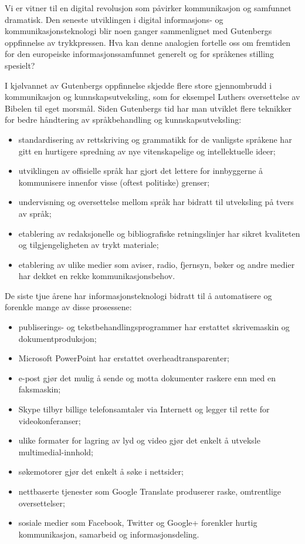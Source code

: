 \begin{multicols}{2}

Vi er vitner til en digital revolusjon som påvirker kommunikasjon og samfunnet dramatisk. Den seneste utviklingen i digital informasjons- og kommunikasjonsteknologi blir noen ganger sammenlignet med Gutenbergs oppfinnelse av trykkpressen. Hva kan denne analogien fortelle oss om fremtiden for den europeiske informasjonssamfunnet generelt og for språkenes stilling spesielt?


I kjølvannet av Gutenbergs oppfinnelse skjedde flere store gjennombrudd i kommunikasjon og kunnskapsutveksling, som for eksempel Luthers oversettelse av Bibelen til eget morsmål. Siden Gutenbergs tid har man utviklet flere teknikker for bedre håndtering av språkbehandling og kunnskapsutveksling:

\begin{itemize}
\item standardisering av rettskriving og grammatikk for de vanligste språkene har gitt en hurtigere  spredning av nye vitenskapelige og intellektuelle ideer;
\item utviklingen av offisielle språk har gjort det lettere for innbyggerne å kommunisere innenfor visse (oftest politiske) grenser;
\item undervisning og oversettelse mellom språk har bidratt til utveksling på tvers av språk;
\item etablering av redaksjonelle og bibliografiske retningslinjer har sikret kvaliteten og tilgjengeligheten av trykt materiale;
\item etablering av ulike medier som aviser, radio, fjernsyn, bøker og andre medier har dekket en rekke kommunikasjonsbehov.
\end{itemize}

De siste tjue årene har informasjonsteknologi bidratt til å automatisere og forenkle mange av disse prosessene:

\begin{itemize}
\item publiserings- og tekstbehandlingsprogrammer har erstattet skrivemaskin og dokumentproduksjon;
\item Microsoft PowerPoint har erstattet overheadtransparenter;
\item e-post gjør det mulig å sende og motta dokumenter raskere enn med en faksmaskin;
\item Skype tilbyr billige telefonsamtaler via Internett og legger til rette for videokonferanser;
\item ulike formater for lagring av lyd og video gjør det enkelt å utveksle multimedial-innhold;
\item søkemotorer gjør det enkelt å søke i nettsider;
\item nettbaserte tjenester som Google Translate produserer raske, omtrentlige oversettelser;
\item sosiale medier som Facebook, Twitter og Google+ forenkler hurtig kommunikasjon, samarbeid og informasjonsdeling.
\end{itemize}


\end{multicols}
